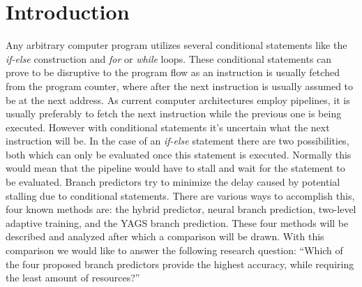 \section{Introduction}

Any arbitrary computer program utilizes several conditional statements like the \textit{if-else} construction and \textit{for} or \textit{while} loops.
These conditional statements can prove to be disruptive to the program flow as an instruction is usually fetched from the program counter, where after the next instruction is usually assumed to be at the next address.
As current computer architectures employ pipelines, it is usually preferably to fetch the next instruction while the previous one is being executed.
However with conditional statements it's uncertain what the next instruction will be.
In the case of an \textit{if-else} statement there are two possibilities, both which can only be evaluated once this statement is executed.
Normally this would mean that the pipeline would have to stall and wait for the statement to be evaluated.
Branch predictors try to minimize the delay caused by potential stalling due to conditional statements.
There are various ways to accomplish this, four known methods are: the hybrid predictor, neural branch prediction, two-level adaptive training, and the YAGS branch prediction.
These four methods will be described and analyzed after which a comparison will be drawn.
With this comparison we would like to answer the following research question:
\enquote{Which of the four proposed branch predictors provide the highest accuracy, while requiring the least amount of resources?}
